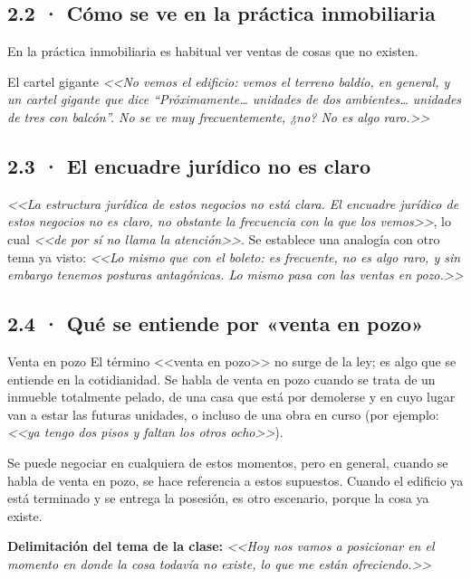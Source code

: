 \documentclass[12pt,oneside]{book}
\begin{document}
\subsection{2.2 · Cómo se ve en la práctica inmobiliaria}

En la práctica inmobiliaria es habitual ver ventas de cosas que no existen.

\begin{example}{El cartel gigante}
\textit{<<No vemos el edificio: vemos el terreno baldío, en general, y un cartel gigante que dice ``Próximamente\ldots{} unidades de dos ambientes\ldots{} unidades de tres con balcón''. No se ve muy frecuentemente, ¿no? No es algo raro.>>}
\end{example}

\subsection{2.3 · El encuadre jurídico no es claro}

\textit{<<La estructura jurídica de estos negocios no está clara. El encuadre jurídico de estos negocios no es claro, no obstante la frecuencia con la que los vemos>>}, lo cual \textit{<<de por sí no llama la atención>>}. Se establece una analogía con otro tema ya visto: \textit{<<Lo mismo que con el boleto: es frecuente, no es algo raro, y sin embargo tenemos posturas antagónicas. Lo mismo pasa con las ventas en pozo.>>}

\subsection{2.4 · Qué se entiende por «venta en pozo»}

\begin{definition}{Venta en pozo}
El término <<venta en pozo>> no surge de la ley; es algo que se entiende en la cotidianidad. Se habla de venta en pozo cuando se trata de un inmueble totalmente pelado, de una casa que está por demolerse y en cuyo lugar van a estar las futuras unidades, o incluso de una obra en curso (por ejemplo: \textit{<<ya tengo dos pisos y faltan los otros ocho>>}).
\end{definition}

Se puede negociar en cualquiera de estos momentos, pero en general, cuando se habla de venta en pozo, se hace referencia a estos supuestos. Cuando el edificio ya está terminado y se entrega la posesión, es otro escenario, porque la cosa ya existe.

\begin{note}
\textbf{Delimitación del tema de la clase:} \textit{<<Hoy nos vamos a posicionar en el momento en donde la cosa todavía no existe, lo que me están ofreciendo.>>}
\end{note}
\end{document}
